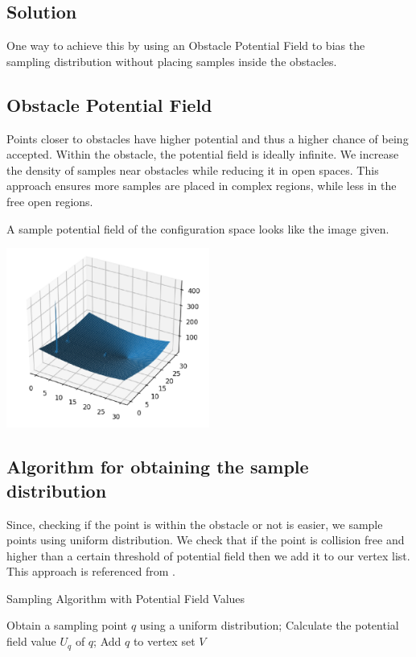 \documentclass[11pt]{article}
\begin{document}
\subsection*{Solution}
One way to achieve this by using an Obstacle Potential Field to bias the sampling distribution without placing samples inside the obstacles.

\subsection*{Obstacle Potential Field}
Points closer to obstacles have higher potential and thus a higher chance of being accepted. Within the obstacle, the potential field is ideally infinite. We increase the density of samples near obstacles while reducing it in open spaces. This approach ensures more samples are placed in complex regions, while less in the free open regions. 

A sample potential field of the configuration space looks like the image given.

\begin{center}
    \includegraphics[width=0.5\textwidth]{artificial_potential_field.png}
\end{center}

\subsection*{Algorithm for obtaining the sample distribution}

Since, checking if the point is within the obstacle or not is easier, we sample points using uniform distribution. We check that if the point is collision free and higher than a certain threshold of potential field then we add it to our vertex list. This approach is referenced from \cite{op-prm}.


\begin{algorithm}
\caption{Sampling Algorithm with Potential Field Values}
\begin{algorithmic}[1]
\STATE Obtain a sampling point \(q\) using a uniform distribution;
\STATE Calculate the potential field value \(U_q\) of \(q\);
    \STATE Add \(q\) to vertex set \(V\)\;
\ENDIF

\end{algorithmic}
\end{algorithm}
\end{document}
